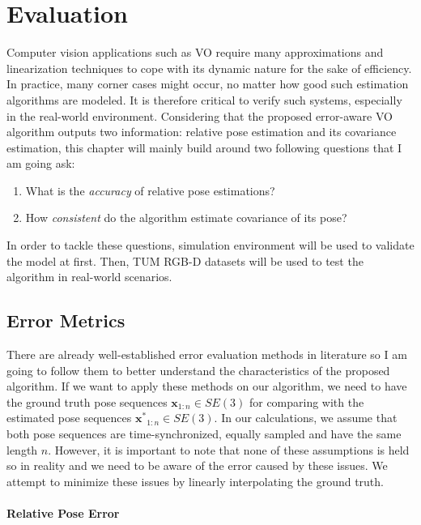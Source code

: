 \documentclass[a4paper]{report}
\numberwithin{figure}{section}
\begin{document}
\chapter{Evaluation} \label{cp_evaluation}

Computer vision applications such as VO require many approximations and linearization techniques to cope with its dynamic nature for the sake of efficiency.  In practice, many corner cases might occur, no matter how good such estimation algorithms are modeled. It is therefore critical to verify such systems, especially in the real-world environment.  Considering that the proposed error-aware VO algorithm outputs two information: relative pose estimation and its covariance estimation, this chapter will mainly build around two following questions that I am going ask:

\begin{enumerate} \item What is the \textit{accuracy} of relative pose estimations?  \item How \textit{consistent} do the algorithm estimate covariance of its pose?  \end{enumerate}

In order to tackle these questions, simulation environment will be used to validate the model at first. Then, TUM RGB-D datasets will be used to test the algorithm in real-world scenarios.

\section{Error Metrics}

There are already well-established error evaluation methods in literature so I am going to follow them to better understand the characteristics of the proposed algorithm.  If we want to apply these methods on our algorithm, we need to have the ground truth pose sequences $\mathbf{x}_{1:n} \in SE(3)$ for comparing with the estimated pose sequences $\mathbf{x^*}_{1:n} \in SE(3)$.  In our calculations, we assume that both pose sequences are time-synchronized, equally sampled and have the same length $n$.  However, it is important to note that none of these assumptions is held so in reality and we need to be aware of the error caused by these issues.  We attempt to minimize these issues by linearly interpolating the ground truth.


\subsubsection{Relative Pose Error}
\end{document}
